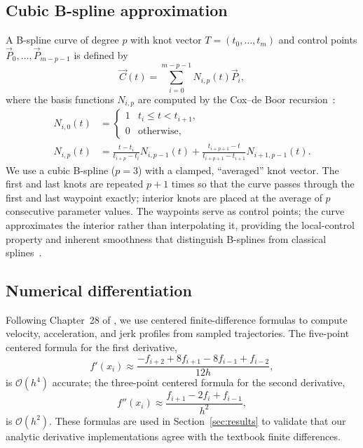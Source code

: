 \subsection{Cubic B-spline approximation}
\label{sec:bg-bspline}

A B-spline curve of degree $p$ with knot vector $T = (t_0, \dots, t_m)$
and control points $\vec{P}_0, \dots, \vec{P}_{m-p-1}$ is defined by
\begin{equation}
\vec{C}(t) = \sum_{i=0}^{m-p-1} N_{i,p}(t) \vec{P}_i,
\label{eq:bspline-curve}
\end{equation}
where the basis functions $N_{i,p}$ are computed by the Cox--de Boor
recursion~\cite{piegl1997nurbs, deboor1978}:
\begin{align}
N_{i,0}(t) &= \begin{cases} 1 & t_i \le t < t_{i+1}, \\ 0 & \text{otherwise}, \end{cases}\\
N_{i,p}(t) &= \frac{t - t_i}{t_{i+p} - t_i} N_{i,p-1}(t)
            + \frac{t_{i+p+1} - t}{t_{i+p+1} - t_{i+1}} N_{i+1,p-1}(t).
\label{eq:cox-de-boor}
\end{align}
We use a cubic B-spline ($p=3$) with a clamped, ``averaged'' knot
vector. The first and last knots are repeated $p+1$ times so that the
curve passes through the first and last waypoint exactly; interior
knots are placed at the average of $p$ consecutive parameter values.
The waypoints serve as control points; the curve approximates the
interior rather than interpolating it, providing the local-control
property and inherent smoothness that distinguish B-splines from
classical splines~\cite{piegl1997nurbs}.

\subsection{Numerical differentiation}
\label{sec:bg-diff}

Following Chapter~28 of \cite{chapra2021}, we use centered
finite-difference formulas to compute velocity, acceleration, and
jerk profiles from sampled trajectories. The five-point centered
formula for the first derivative,
\begin{equation}
f'(x_i) \approx \frac{-f_{i+2} + 8 f_{i+1} - 8 f_{i-1} + f_{i-2}}{12 h},
\label{eq:five-point}
\end{equation}
is $\mathcal{O}(h^4)$ accurate; the three-point centered formula for
the second derivative,
\begin{equation}
f''(x_i) \approx \frac{f_{i+1} - 2 f_i + f_{i-1}}{h^2},
\label{eq:three-point-second}
\end{equation}
is $\mathcal{O}(h^2)$. These formulas are used in
Section~\ref{sec:results} to validate that our analytic derivative
implementations agree with the textbook finite differences.

